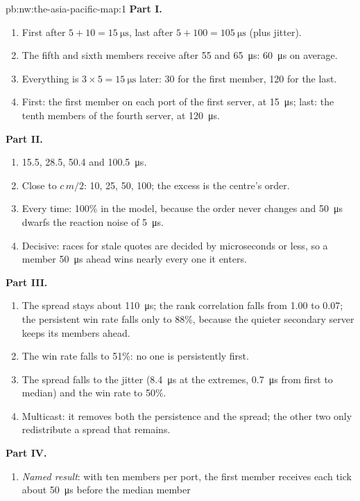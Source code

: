 \begin{solution}{pb:nw:the-asia-pacific-map:1}
\textbf{Part I.}
\begin{enumerate}
\item First after $5 + 10 = \qty{15}{\micro\second}$, last after $5 + 100 = \qty{105}{\micro\second}$ (plus jitter).
\item The fifth and sixth members receive after 55 and \qty{65}{\micro\second}: \qty{60}{\micro\second} on average.
\item Everything is $3 \times 5 = \qty{15}{\micro\second}$ later: 30 for the first member, 120 for the last.
\item First: the first member on each port of the first server, at \qty{15}{\micro\second}; last: the tenth members of the fourth server, at
  \qty{120}{\micro\second}.
\end{enumerate}
\textbf{Part II.}
\begin{enumerate}[resume]
\item 15.5, 28.5, 50.4 and \qty{100.5}{\micro\second}.
\item Close to $c\,m/2$: 10, 25, 50, 100; the excess is the centre's order.
\item Every time: 100\% in the model, because the order never changes and \qty{50}{\micro\second} dwarfs the reaction noise of
  \qty{5}{\micro\second}.
\item Decisive: races for stale quotes are decided by microseconds or less, so a member \qty{50}{\micro\second} ahead wins nearly every one
  it enters.
\end{enumerate}
\textbf{Part III.}
\begin{enumerate}[resume]
\item The spread stays about \qty{110}{\micro\second}; the rank correlation falls from 1.00 to 0.07; the persistent win rate falls only to 88\%,
  because the quieter secondary server keeps its members ahead.
\item The win rate falls to 51\%: no one is persistently first.
\item The spread falls to the jitter (\qty{8.4}{\micro\second} at the extremes, \qty{0.7}{\micro\second} from first to median) and the win
  rate to 50\%.
\item Multicast: it removes both the persistence and the spread; the other two only redistribute a spread that remains.
\end{enumerate}
\textbf{Part IV.}
\begin{enumerate}[resume]
\item \emph{Named result}: with ten members per port, the first member receives each tick about \qty{50}{\micro\second} before the median member

\end{enumerate}
\end{solution}

